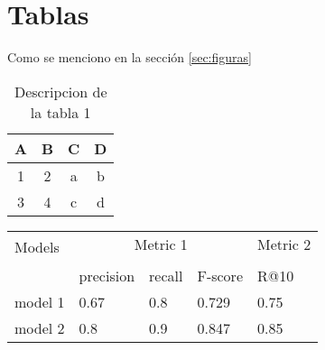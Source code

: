 \section{Tablas}

Como se menciono en la sección \ref{sec:figuras}

\begin{table}[h]
    \centering
    \begin{tabular}{cccc}
        \toprule
        A & B & C & D \\ \midrule
        1 & 2 & a & b \\ \midrule
        3 & 4 & c & d \\ 
        \bottomrule
    \end{tabular}
    \caption{Descripcion de la tabla 1}
    \label{tab:tabla1}
\end{table}

\blindtext

\begin{table}[H]
    \centering
    \begin{tabular}{lllll}
        \toprule
        \multirow{2}{*}{Models} & \multicolumn{3}{c}{Metric 1} & Metric 2\\
        \cmidrule{2-4} \cmidrule{5-5} \\
        {} & precision & recall & F-score  & R@10 \\
        \midrule
        model 1 & 0.67  & 0.8 & 0.729  & 0.75 \\
        model 2 & 0.8 & 0.9 & 0.847 & 0.85 \\
        \bottomrule
    \end{tabular}
\end{table}